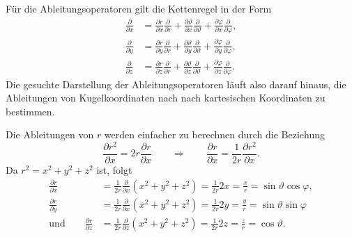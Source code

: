 Für die Ableitungsoperatoren gilt die Kettenregel in der Form
\begin{equation}
\begin{aligned}
\frac{\partial}{\partial x}
&=
\frac{\partial r}{\partial x}\frac{\partial}{\partial r}
+
\frac{\partial\vartheta}{\partial x}\frac{\partial}{\partial\vartheta}
+
\frac{\partial\varphi}{\partial x}\frac{\partial}{\partial\varphi},
\\
\frac{\partial}{\partial y}
&=
\frac{\partial r}{\partial y}\frac{\partial}{\partial r}
+
\frac{\partial\vartheta}{\partial y}\frac{\partial}{\partial\vartheta}
+
\frac{\partial\varphi}{\partial y}\frac{\partial}{\partial\varphi},
\\
\frac{\partial}{\partial z}
&=
\frac{\partial r}{\partial z}\frac{\partial}{\partial r}
+
\frac{\partial\vartheta}{\partial z}\frac{\partial}{\partial\vartheta}
+
\frac{\partial\varphi}{\partial z}\frac{\partial}{\partial\varphi}.
\end{aligned}
\label{skript:kugel:kettenregel}
\end{equation}
Die gesuchte Darstellung der Ableitungsoperatoren läuft also darauf
hinaus, die Ableitungen von Kugelkoordinaten nach nach kartesischen
Koordinaten zu bestimmen.

Die Ableitungen von $r$ werden einfacher zu berechnen durch die
Beziehung
\[
\frac{\partial r^2}{\partial x}
=
2r\frac{\partial r}{\partial x}
\qquad\Rightarrow\qquad
\frac{\partial r}{\partial x}
=\frac1{2r}\frac{\partial r^2}{\partial x}.
\]
Da $r^2=x^2+y^2+z^2$ ist, folgt
\begin{equation}
\begin{aligned}
\frac{\partial r}{\partial x}
&=
\frac1{2r}\frac{\partial}{\partial x}(x^2+y^2+z^2)
=
\frac1{2r}2x
=
\frac{x}{r}
=
\sin\vartheta\cos\varphi,
\\
\frac{\partial r}{\partial y}
&=
\frac1{2r}\frac{\partial}{\partial x}(x^2+y^2+z^2)
=
\frac1{2r}2y
=
\frac{y}{r}
=
\sin\vartheta\sin\varphi
\\
\text{und}
\qquad
\frac{\partial r}{\partial z}
&=
\frac1{2r}\frac{\partial}{\partial z}(x^2+y^2+z^2)
=
\frac1{2r}2z
=
\frac{z}{r}
=
\cos\vartheta.
\end{aligned}
\label{skript:kugel:rableitungen}
\end{equation}

